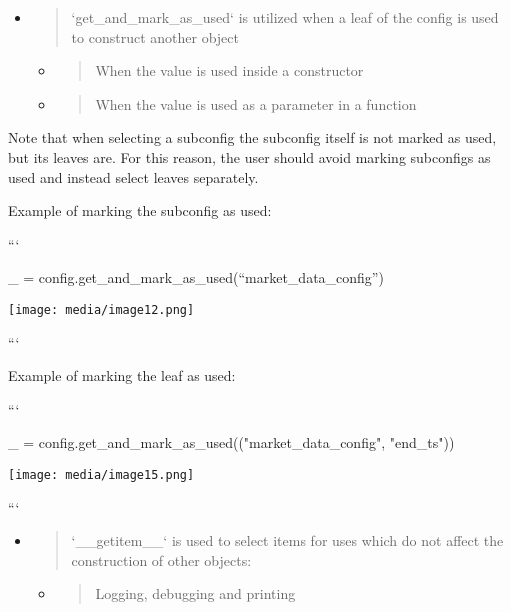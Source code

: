 \documentclass[11pt, reqno]{amsart}
\begin{document}
\begin{itemize}
\item
  \begin{quote}
  `get\_and\_mark\_as\_used` is utilized when a leaf of the config is
  used to construct another object
  \end{quote}

  \begin{itemize}
  \item
    \begin{quote}
    When the value is used inside a constructor
    \end{quote}
  \item
    \begin{quote}
    When the value is used as a parameter in a function
    \end{quote}
  \end{itemize}
\end{itemize}

Note that when selecting a subconfig the subconfig itself is not marked
as used, but its leaves are. For this reason, the user should avoid
marking subconfigs as used and instead select leaves separately.

Example of marking the subconfig as used:

```

\_ = config.get\_and\_mark\_as\_used(``market\_data\_config'')

\texttt{[image: media/image12.png]}

```

Example of marking the leaf as used:

```

\_ = config.get\_and\_mark\_as\_used(("market\_data\_config",
"end\_ts"))

\texttt{[image: media/image15.png]}

```

\begin{itemize}
\item
  \begin{quote}
  `\_\_getitem\_\_` is used to select items for uses which do not affect
  the construction of other objects:
  \end{quote}

  \begin{itemize}
  \item
    \begin{quote}
    Logging, debugging and printing
    \end{quote}
  \end{itemize}
\end{itemize}
\end{document}
